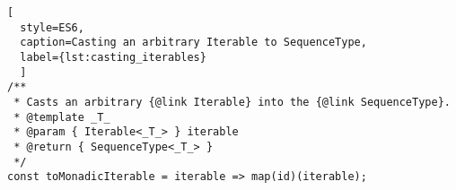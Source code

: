 \begin{lstlisting}[
  style=ES6, 
  caption=Casting an arbitrary Iterable to SequenceType,
  label={lst:casting_iterables}
  ]
/**
 * Casts an arbitrary {@link Iterable} into the {@link SequenceType}.
 * @template _T_
 * @param { Iterable<_T_> } iterable
 * @return { SequenceType<_T_> }
 */
const toMonadicIterable = iterable => map(id)(iterable);
\end{lstlisting}

